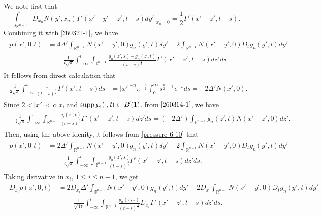 \documentclass{amsart}
\numberwithin{equation}{section}
\newcommand{\Rn}{{\mathbb R}^{n-1}}
\newcommand{\De}{\Delta}
\newcommand{\Ga}{\Gamma}
\begin{document}
 
We note first that 
\[
\int_{\Rn} D_{x_n} N(y', x_n) \Ga' (x'-y' -z', t-s) dy' \Big|_{x_n =0} = \frac12 \Ga' (x'-z', t-s).
\]
Combining it with \eqref{260321-1}, we have 
\begin{align}\label{pressure-6-10}
\begin{split}
p(x',0,t) 
& = 4 \De'\int_{\Rn} N(x' -y', 0) g_n (y', t) dy' - 2 \int_{\Rn} N(x' -y', 0)  D_t g_n (y', t) dy'    \\
& \quad - \frac{1}{2\sqrt{ \pi}} \int_{-\infty}^t \int_{\Rn}\frac{g_n (z',s) -g_n(z',t)}{(t -s)^{\frac{3}{2}}} 
    \Ga'(x' -z',t-s)  dz' ds.
\end{split}
\end{align}
It follows from  direct calculation that
\begin{align}\label{260314-1}
\begin{split}
\frac{1}{2\sqrt{ \pi}} \int_{-\infty}^t \frac{1}{(t -s)^{\frac{3}{2}}} \Ga' (x', t-s) ds 
& = |x'|^{-n} \pi^{-\frac{n}2} \int_0^\infty s^{\frac{n}2 -1} e^{-s} ds = - 2\De' N(x', 0).
\end{split}
\end{align}
Since   $2 < |x'| < c_1 x_i$ and ${\rm supp} \, g_n(\cdot, t) \subset B'(1)$, from $\eqref{260314-1}$, we have 
\begin{align*}
\begin{split}
& \frac{1}{2\sqrt{\pi}} \int_{-\infty}^t \int_{\Rn} \frac{g_n (z', t)}{(t -s)^{\frac{3}{2}}} 
   \Ga'(x' -z',t-s)   dz' ds = (-2\De') \int_{\Rn} g_n (z', t)   N(x'  -z',0)   dz'.
\end{split}
 \end{align*}
Then, using the above idenity, it follows from \eqref{pressure-6-10} that
 \begin{align*}
\begin{split}
p(x',0,t) 
& = 2\De'\int_{\Rn} N(x' -y', 0) g_n (y', t) dy' - 2 \int_{\Rn} N(x' -y', 0)  D_t g_n (y', t) dy'    \\
& \quad - \frac{1}{2\sqrt{\pi}} \int_{-\infty}^t \int_{\Rn}\frac{g_n (z',s)  }{(t -s)^{\frac{3}{2}}} 
    \Ga'(x' -z',t-s)  dz' ds.
\end{split}
\end{align*}
Taking derivative in $x_i$,  $ 1 \leq i \leq n-1$, we get
  \begin{align*}
\begin{split}
D_{x_i} p(x',0,t) 
& = 2D_{x_i} \De'\int_{\Rn} N(x' -y', 0) g_n (y', t) dy' - 2 D_{x_i} \int_{\Rn} N(x' -y', 0)  D_t g_n (y', t) dy'    \\
& \quad - \frac{1}{\sqrt{4 \pi}} \int_{-\infty}^t \int_{\Rn}\frac{g_n (z',s)  }{(t -s)^{\frac{3}{2}}} 
    D_{x_i}\Ga'(x' -z',t-s)  dz' ds.
\end{split}
\end{align*}
\end{document}
